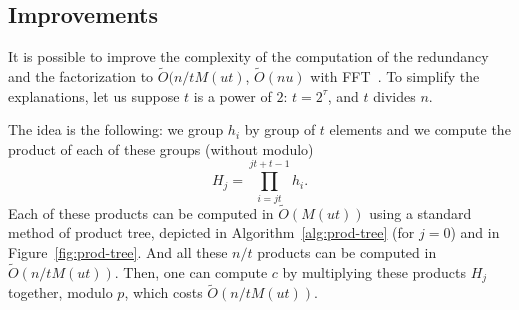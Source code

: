 \documentclass[11pt]{llncs}
\newcommand{\Oapp}{\ensuremath{\tilde{O}}}
\begin{document}
\subsection{Improvements}

It is possible to improve the complexity of the computation of the redundancy and the factorization to $\Oapp(n/t M(u t)$, $\Oapp(n u)$ with FFT~\cite{schonhage1971schnelle}.
To simplify the explanations, let us suppose $t$ is a power of $2$: $t=2^\tau$, and $t$ divides $n$.

The idea is the following: we group $h_i$ by group of $t$ elements and we compute the product of each of these groups (without modulo)
\[ H_j = \prod_{i=j t}^{j t + t - 1} h_i. \]
Each of these products can be computed in $\Oapp(M(u t))$ using a standard method of product tree, depicted in Algorithm~\ref{alg:prod-tree} (for $j=0$) and in Figure~\ref{fig:prod-tree}.
And all these $n / t$ products can be computed in $\Oapp(n/t M(u t))$.
Then, one can compute $c$ by multiplying these products $H_j$ together, modulo $p$, which costs $\Oapp(n/t M(u t))$.
\end{document}
